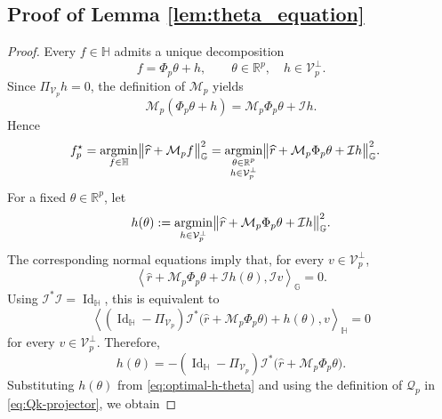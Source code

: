 \documentclass{article}
\theoremstyle{definition}
\theoremstyle{remark}
\theoremstyle{plain}
\def\argmin{\operatornamewithlimits{argmin}}
\newcommand{\dsieve}{p}
\numberwithin{equation}{section}
\begin{document}
\subsection{Proof of Lemma \ref{lem:theta_equation}}
\label{app:theta_equation}
\begin{proof}
Every \(f\in\mathbb H\) admits a unique decomposition
\[
    f=\Phi_\dsieve\theta+h,
    \qquad
    \theta\in\mathbb R^\dsieve,
    \quad
    h\in\mathcal V_\dsieve^\perp.
\]
Since \(\Pi_{\mathcal V_\dsieve}h=0\), the definition of \(\mathcal M_\dsieve\) yields
\begin{equation}
\label{eq:Mk-splitting}
    \mathcal M_\dsieve(\Phi_\dsieve\theta+h)
    =
    \mathcal M_\dsieve\Phi_\dsieve\theta+\mathcal I h.
\end{equation}
Hence
\begin{align}
    f_\dsieve^\star
    &=
    \argmin_{f\in\mathbb H}
    \bigl\|
        \widehat r+\mathcal M_\dsieve f
    \bigr\|_{\mathbb G}^2=\argmin_{\substack{\theta\in\mathbb R^\dsieve\\ h\in\mathcal V_\dsieve^\perp}}
    \bigl\|
        \widehat r+\mathcal M_\dsieve\Phi_\dsieve\theta+\mathcal I h
    \bigr\|_{\mathbb G}^2.
\end{align}
For a fixed \(\theta\in\mathbb R^\dsieve\), let
\[
    h(\theta)
    :=
    \argmin_{h\in\mathcal V_\dsieve^\perp}
    \bigl\|
        \widehat r+\mathcal M_\dsieve\Phi_\dsieve\theta+\mathcal I h
    \bigr\|_{\mathbb G}^2.
\]
The corresponding normal equations imply that, for every
\(v\in\mathcal V_\dsieve^\perp\),
\[
    \left\langle
        \widehat r+\mathcal M_\dsieve\Phi_\dsieve\theta+\mathcal I h(\theta),
        \mathcal I v
    \right\rangle_{\mathbb G}
    =0.
\]
Using \(\mathcal I^\ast\mathcal I=\operatorname{Id}_{\mathbb H}\), this is equivalent to
\[
    \left\langle
        (\operatorname{Id}_{\mathbb H}-\Pi_{\mathcal V_\dsieve})
        \mathcal I^\ast
        \bigl(
            \widehat r+\mathcal M_\dsieve\Phi_\dsieve\theta
        \bigr)
        +h(\theta),
        v
    \right\rangle_{\mathbb H}
    =0
\]
for every \(v\in\mathcal V_\dsieve^\perp\). Therefore,
\begin{equation}
\label{eq:optimal-h-theta}
    h(\theta)
    =
    -
    (\operatorname{Id}_{\mathbb H}-\Pi_{\mathcal V_\dsieve})
    \mathcal I^\ast
    \bigl(
        \widehat r+\mathcal M_\dsieve\Phi_\dsieve\theta
    \bigr).
\end{equation}
Substituting \(h(\theta)\) from \eqref{eq:optimal-h-theta} and using the definition of \(\mathcal Q_\dsieve\) in \eqref{eq:Qk-projector}, we obtain

\end{proof}
\end{document}
